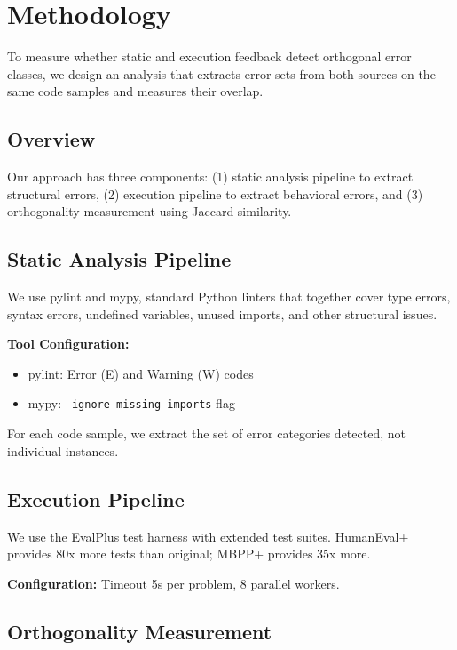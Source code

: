 \section{Methodology}
\label{sec:methodology}

To measure whether static and execution feedback detect orthogonal error classes, we design an analysis that extracts error sets from both sources on the same code samples and measures their overlap.

\subsection{Overview}

Our approach has three components: (1) static analysis pipeline to extract structural errors, (2) execution pipeline to extract behavioral errors, and (3) orthogonality measurement using Jaccard similarity.

\subsection{Static Analysis Pipeline}

We use pylint and mypy, standard Python linters that together cover type errors, syntax errors, undefined variables, unused imports, and other structural issues.

\textbf{Tool Configuration:}
\begin{itemize}
    \item pylint: Error (E) and Warning (W) codes
    \item mypy: \texttt{--ignore-missing-imports} flag
\end{itemize}

For each code sample, we extract the set of error categories detected, not individual instances.

\subsection{Execution Pipeline}

We use the EvalPlus test harness with extended test suites. HumanEval+ provides 80x more tests than original; MBPP+ provides 35x more.

\textbf{Configuration:} Timeout 5s per problem, 8 parallel workers.

\subsection{Orthogonality Measurement}

